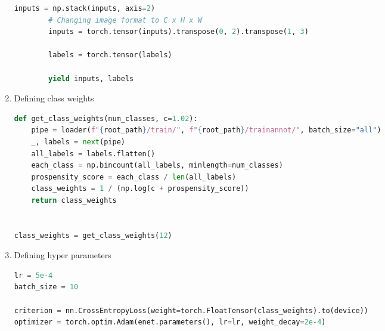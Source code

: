 \begin{enumerate}
\begin{lstlisting}[language=Python]
        inputs = np.stack(inputs, axis=2)
        # Changing image format to C x H x W
        inputs = torch.tensor(inputs).transpose(0, 2).transpose(1, 3)

        labels = torch.tensor(labels)

        yield inputs, labels
\end{lstlisting}
	\item Defining class weights
	      \begin{lstlisting}[language=Python]
def get_class_weights(num_classes, c=1.02):
    pipe = loader(f"{root_path}/train/", f"{root_path}/trainannot/", batch_size="all")
    _, labels = next(pipe)
    all_labels = labels.flatten()
    each_class = np.bincount(all_labels, minlength=num_classes)
    prospensity_score = each_class / len(all_labels)
    class_weights = 1 / (np.log(c + prospensity_score))
    return class_weights


class_weights = get_class_weights(12)
\end{lstlisting}
	\item Defining hyper parameters
	      \begin{lstlisting}[language=Python]
lr = 5e-4
batch_size = 10

criterion = nn.CrossEntropyLoss(weight=torch.FloatTensor(class_weights).to(device))
optimizer = torch.optim.Adam(enet.parameters(), lr=lr, weight_decay=2e-4)


\end{lstlisting}
\end{enumerate}
